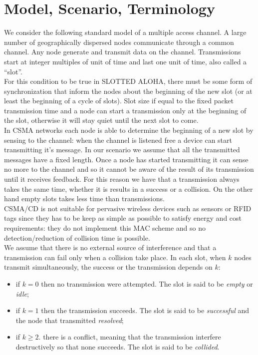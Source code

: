 \documentclass[12pt,a4paper]{report}
\begin{document}
\section{Model, Scenario, Terminology}

We consider the following standard model of a multiple access channel. A large number of geographically dispersed nodes communicate through a common channel. Any node generate and transmit data on the channel. Transmissions start at integer multiples of unit of time and last one unit of time, also called a ``slot''.\\

For this condition to be true in SLOTTED ALOHA, there must be some form of synchronization that inform the nodes about the beginning of the new slot (or at least the beginning of a cycle of slots). Slot size if equal to the fixed packet transmission time and a node can start a transmission only at the beginning of the slot, otherwise it will stay quiet until the next slot to come.\\

In CSMA networks each node is able to determine the beginning of a new slot by sensing to the channel: when the channel is listened free a device can start transmitting it's message. In our scenario we assume that all the transmitted messages have a fixed length. Once a node has started transmitting it can sense no more to the channel and so it cannot be aware of the result of its transmission until it receives feedback. For this reason we have that a transmission always takes the same time, whether it is results in a success or a collision. On the other hand empty slots takes less time than transmissions.\\

CSMA/CD is not suitable for pervasive wireless devices such as sensors or RFID tags since they has to be keep as simple as possible to satisfy energy and cost requirements: they do not implement this MAC scheme and so no detection/reduction of collision time is possible.\\

We assume that there is no external source of interference and that a transmission can fail only when a collision take place.
In each slot, when $k$ nodes transmit simultaneously, the success or the transmission depends on $k$:
\begin{itemize}
\item if $k=0$ then no transmission were attempted. The slot is said to be \emph{empty} or \emph{idle};
\item if $k=1$ then the transmission succeeds. The slot is said to be \emph{successful} and the node that transmitted \emph{resolved};
\item if $k\geq 2$. there is a conflict, meaning that the transmission interfere destructively so that none succeeds. The slot is said to be \emph{collided}.
\end{itemize}
\end{document}
